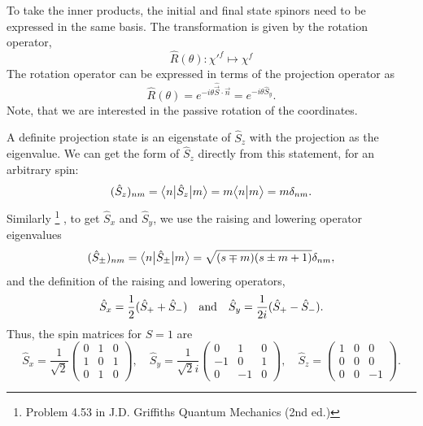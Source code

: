 \documentclass[12pt]{article}
\begin{document}
To take the inner products, the initial and final state spinors need to be expressed in the same basis.
The transformation is given by the rotation operator,
\begin{equation}
  \hat{R}(\theta) : \chi'^f \mapsto \chi^f
\end{equation}
%
The rotation operator can be expressed in terms of the projection operator as
\begin{equation}\label{eq:RexpS}
  \hat{R}(\theta) = e^{-i\theta \hat{\vec{S}}\cdot\vec{n}}
  = e^{-i\theta \hat{S}_y}.
\end{equation}
Note, that we are interested in the passive rotation of the coordinates.

A definite projection state is an eigenstate of $\hat{S}_z$ with the projection as the eigenvalue. We can get the form of $\hat{S}_z$ directly from this statement, for an arbitrary spin:
\begin{equation}
  (\hat{S}_z)_{nm} = \big<n\big|\hat{S}_z\big|m\big> = m\big<n\big|m\big> = m\delta_{nm}.
\end{equation}
%
Similarly%
\footnote{Problem 4.53 in J.D. Griffiths Quantum Mechanics (2nd ed.)}%
, to get $\hat{S}_x$ and $\hat{S}_y$, we use the raising and lowering operator eigenvalues
\begin{equation}
  (\hat{S}_\pm)_{nm} = \big<n\big|\hat{S}_\pm\big|m\big> = \sqrt{(s\mp m)(s\pm m+1)}\delta_{nm},
\end{equation}
and the definition of the raising and lowering operators,
\begin{equation}
  \hat{S}_x = \frac{1}{2}(\hat{S}_+ + \hat{S}_-)
  \quad \text{and} \quad
  \hat{S}_y = \frac{1}{2i}(\hat{S}_+ - \hat{S}_-).
\end{equation}
%
Thus, the spin matrices for $S=1$ are
\begin{equation}
  \hat{S}_x = \frac{1}{\sqrt{2}}\begin{pmatrix}
    0 & 1 & 0 \\
    1 & 0 & 1 \\
    0 & 1 & 0
  \end{pmatrix}, \quad
  \hat{S}_y = \frac{1}{\sqrt{2}i}\begin{pmatrix}
    0 & 1 & 0 \\
   -1 & 0 & 1 \\
    0 &-1 & 0
  \end{pmatrix}, \quad
  \hat{S}_z = \begin{pmatrix}
    1 & 0 & 0 \\
    0 & 0 & 0 \\
    0 & 0 & -1
  \end{pmatrix}.
\end{equation}
\end{document}
